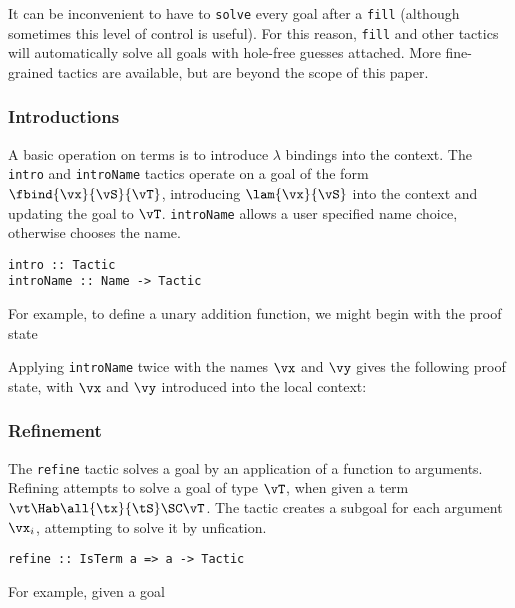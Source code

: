 It can be inconvenient to have to \texttt{solve} every goal after a
\texttt{fill} (although sometimes this level of control is
useful). For this reason, \texttt{fill} and other tactics will
automatically solve all goals with hole-free guesses attached. More
fine-grained tactics are available, but are beyond the scope of this paper.


\subsubsection{Introductions}

A basic operation on terms is to introduce $\lambda$ bindings into the
context. The \texttt{intro} and \texttt{introName} tactics operate on
a goal of the form $\fbind{\vx}{\vS}{\vT}$, introducing
$\lam{\vx}{\vS}$ into the context and updating the goal to
$\vT$. \texttt{introName} allows a user specified name choice,
otherwise \Ivor{} chooses the name.

\begin{verbatim}
intro :: Tactic
introName :: Name -> Tactic
\end{verbatim}

For example, to define a unary addition function, we might begin
with the proof state


Applying \texttt{introName} twice with the names $\vx$ and $\vy$ gives
the following proof state, with $\vx$ and $\vy$ introduced into the
local context:


\subsubsection{Refinement}

The \texttt{refine} tactic solves a goal by an application of a
function to arguments. Refining attempts to solve a goal of type
$\vT$, when given a term $\vt\Hab\all{\tx}{\tS}\SC\vT$. The tactic
creates a subgoal for each argument $\vx_i$, attempting to solve it by
unfication.

\begin{verbatim}
refine :: IsTerm a => a -> Tactic
\end{verbatim}

For example, given a goal
\DM{
\Axiom{
\hole{\vv}{\Vect\:\Nat\:(\suc\:\vn)}}
}


